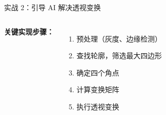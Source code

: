 \begin{frame}{实战 2：引导 AI 解决透视变换}
\begin{columns}
		\vspace{0.2cm}

		\textbf{关键实现步骤：}
		\begin{enumerate}
			\item 预处理（灰度、边缘检测）
			\item 查找轮廓，筛选最大四边形
			\item 确定四个角点
			\item 计算变换矩阵
			\item 执行透视变换
		\end{enumerate}
	\end{columns}
\end{frame}



